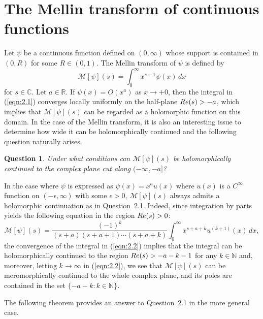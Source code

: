 \documentclass[10pt,a4paper]{amsart}
\numberwithin{equation}{section}
\newtheorem{question}[theorem]{Question}
\newcommand{\R}{{\mathbb R}}
\newcommand{\C}{{\mathbb C}}
\newcommand{\N}{{\mathbb N}}
\newcommand{\1}{{\bf 1}}
\begin{document}

\section{The Mellin transform of continuous functions}

Let $\psi$ be a continuous function 
defined on $(0,\infty)$ whose support is contained 
in $(0,R)$ for some $R \in (0,1)$.
The Mellin transform of $\psi$ is defined by
\begin{equation}\label{eqn:2.1}
{\mathcal M}[\psi](s)
=\int_0^{\infty} x^{s-1}\psi(x)\,dx
\end{equation}
for $s \in \C$. 
Let $a\in\R$. 
If $\psi(x)=O(x^{a})$ as 
$x\to +0$, then 
the integral in (\ref{eqn:2.1}) converges locally uniformly
on the half-plane ${\rm Re}(s)>-a$, 
which implies that 
${\mathcal M}[\psi](s)$ can be 
regarded as a holomorphic function 
on this domain. 
In the case of the Mellin transform, 
it is also an interesting issue to determine
how wide it can be holomorphically continued
and the following question naturally arises. 
\begin{question}
Under what conditions can  
${\mathcal M}[\psi](s)$
be holomorphically continued to the complex plane cut along 
$(-\infty,-a]$?
\end{question}
In the case where $\psi$ is expressed as 
$\psi(x)=x^a u(x)$ where $u(x)$ is a 
$C^{\infty}$ function on 
$(-\epsilon, \infty)$ with some $\epsilon>0$, 
${\mathcal M}[\psi](s)$ always admits a
holomorphic continuation as in Question~2.1.
Indeed, 
since integration by parts yields the following 
equation in the region ${\rm Re}(s)>0$:
\begin{equation}\label{eqn:2.2}
{\mathcal M}[\psi](s)
=\frac{(-1)^k}{(s+a)(s+a+1)\cdots(s+a+k)}
\int_0^{\infty} x^{s+a+k} u^{(k+1)}(x)\,dx, 
\end{equation}
the convergence of the integral 
in (\ref{eqn:2.2}) implies 
that 
the integral can be holomorphically 
continued to the region ${\rm Re}(s)>-a-k-1$
for any $k\in\N$ and, 
moreover, letting $k\to \infty$ in (\ref{eqn:2.2}), 
we see that 
${\mathcal M}[\psi](s)$ can be meromorphically 
continued to the whole complex plane, and 
its poles are contained in the set 
$\{-a-k:k\in\N\}$.  

The following theorem provides an answer 
to Question~2.1 in the more general case. 
\end{document}
